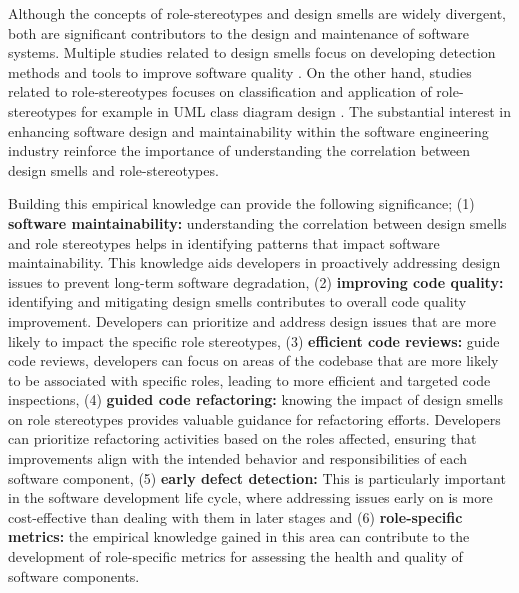 \documentclass[AMA,Times1COL]{WileyNJDv5} %
\begin{document}
Although the concepts of role-stereotypes and design smells are widely divergent, both are significant contributors to the design and maintenance of software systems. Multiple studies related to design smells focus on developing detection methods and tools to improve software quality \cite{barbez2020machine,kaur2018detecting, liu2018deep}. On the other hand, studies related to role-stereotypes focuses on classification \cite{dragan2010automatic,nurwidyantoro2019automated} and application of role-stereotypes for example in UML class diagram design \cite{kuzniarz2004empirical}. The substantial interest in enhancing software design and maintainability within the software engineering industry reinforce the importance of understanding the correlation between design smells and role-stereotypes.

 Building this empirical knowledge can provide the following significance; (1) \textbf{software maintainability:} understanding the correlation between design smells and role stereotypes helps in identifying patterns that impact software maintainability. This knowledge aids developers in proactively addressing design issues to prevent long-term software degradation, (2) \textbf{improving code quality:} identifying and mitigating design smells contributes to overall code quality improvement. Developers can prioritize and address design issues that are more likely to impact the specific role stereotypes, (3) \textbf{efficient code reviews:} guide code reviews, developers can focus on areas of the codebase that are more likely to be associated with specific roles, leading to more efficient and targeted code inspections, (4) \textbf{guided code refactoring:} knowing the impact of design smells on role stereotypes provides valuable guidance for refactoring efforts. Developers can prioritize refactoring activities based on the roles affected, ensuring that improvements align with the intended behavior and responsibilities of each software component, (5) \textbf{early  defect detection:} This is particularly important in the software development life cycle, where addressing issues early on is more cost-effective than dealing with them in later stages and (6) \textbf{role-specific metrics:} the empirical knowledge gained in this area can contribute to the development of role-specific metrics for assessing the health and quality of software components.
\end{document}
